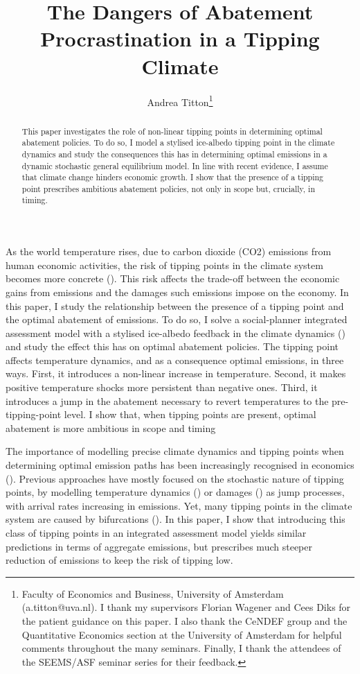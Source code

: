 \documentclass[american, abstract=off]{scrartcl}
\author{Andrea Titton\thanks{
      Faculty of Economics and Business, University of Amsterdam (a.titton@uva.nl). I thank my supervisors Florian Wagener and Cees Diks for the patient guidance on this paper. I also thank the CeNDEF group and the Quantitative Economics section at the University of Amsterdam for helpful comments throughout the many seminars. Finally, I thank the attendees of the SEEMS/ASF seminar series for their feedback.
    }}
\title{The Dangers of Abatement Procrastination in a Tipping Climate}
\begin{document}
\maketitle

\begin{abstract}
  This paper investigates the role of non-linear tipping points in determining optimal abatement policies. To do so, I model a stylised ice-albedo tipping point in the climate dynamics and study the consequences this has in determining optimal emissions in a dynamic stochastic general equilibrium model. In line with recent evidence, I assume that climate change hinders economic growth. I show that the presence of a tipping point prescribes ambitious abatement policies, not only in scope but, crucially, in timing. 
\end{abstract}

\newpage
As the world temperature rises, due to carbon dioxide (CO2) emissions from human economic activities, the risk of tipping points in the climate system becomes more concrete (\cite{ashwin_extreme_2020,sledd_cloudier_2021}). This risk affects the trade-off between the economic gains from emissions and the damages such emissions impose on the economy. In this paper, I study the relationship between the presence of a tipping point and the optimal abatement of emissions. To do so, I solve a social-planner integrated assessment model with a stylised ice-albedo feedback in the climate dynamics (\cite{hogg_glacial_2008,ashwin_tipping_2012}) and study the effect this has on optimal abatement policies. The tipping point affects temperature dynamics, and as a consequence optimal emissions, in three ways. First, it introduces a non-linear increase in temperature. Second, it makes positive temperature shocks more persistent than negative ones. Third, it introduces a jump in the abatement necessary to revert temperatures to the pre-tipping-point level. I show that, when tipping points are present, optimal abatement is more ambitious in scope and timing

The importance of modelling precise climate dynamics and tipping points when determining optimal emission paths has been increasingly recognised in economics (\cite{van_den_bremer_risk-adjusted_2021,dietz_economic_2021,dietz_are_2020,taconet_social_2021,lontzek_stochastic_2015}). Previous approaches have mostly focused on the stochastic nature of tipping points, by modelling temperature dynamics (\cite{dietz_economic_2021}) or damages (\cite{lontzek_stochastic_2015}) as jump processes, with arrival rates increasing in emissions. Yet, many tipping points in the climate system are caused by bifurcations (\cite{ashwin_extreme_2020,ashwin_tipping_2012}). In this paper, I show that introducing this class of tipping points in an integrated assessment model yields similar predictions in terms of aggregate emissions, but prescribes much steeper reduction of emissions to keep the risk of tipping low.
\end{document}
